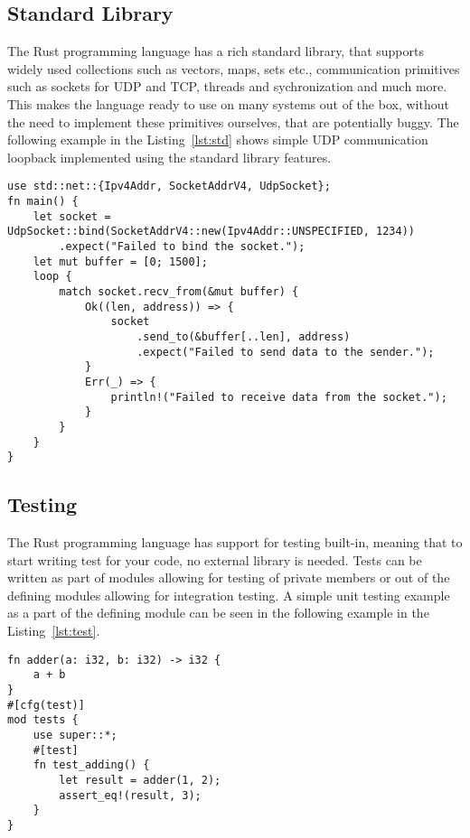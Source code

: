 \subsection{Standard Library}
\label{subsec:std_lib}
The Rust programming language has a rich standard library, that supports widely used collections such as vectors, maps, sets etc., communication primitives such as sockets for UDP and TCP, threads and sychronization and much more.
This makes the language ready to use on many systems out of the box, without the need to implement these primitives ourselves, that are potentially buggy.
The following example in the Listing~\ref{lst:std} shows simple UDP communication loopback implemented using the standard library features.

\begin{lstlisting}[caption={Using Rust standard library to implement UDP loopback.},label=lst:std]
use std::net::{Ipv4Addr, SocketAddrV4, UdpSocket};
fn main() {
    let socket = UdpSocket::bind(SocketAddrV4::new(Ipv4Addr::UNSPECIFIED, 1234))
        .expect("Failed to bind the socket.");
    let mut buffer = [0; 1500];
    loop {
        match socket.recv_from(&mut buffer) {
            Ok((len, address)) => {
                socket
                    .send_to(&buffer[..len], address)
                    .expect("Failed to send data to the sender.");
            }
            Err(_) => {
                println!("Failed to receive data from the socket.");
            }
        }
    }
}
\end{lstlisting}

\subsection{Testing}
\label{subsec:testing}
The Rust programming language has support for testing built-in, meaning that to start writing test for your code, no external library is needed.
Tests can be written as part of modules allowing for testing of private members or out of the defining modules allowing for integration testing.
A simple unit testing example as a part of the defining module can be seen in the following example in the Listing~\ref{lst:test}.

\begin{lstlisting}[caption={Writing in-module tests for Rust members.},label=lst:test]
fn adder(a: i32, b: i32) -> i32 {
    a + b
}
#[cfg(test)]
mod tests {
    use super::*;
    #[test]
    fn test_adding() {
        let result = adder(1, 2);
        assert_eq!(result, 3);
    }
}
\end{lstlisting}

